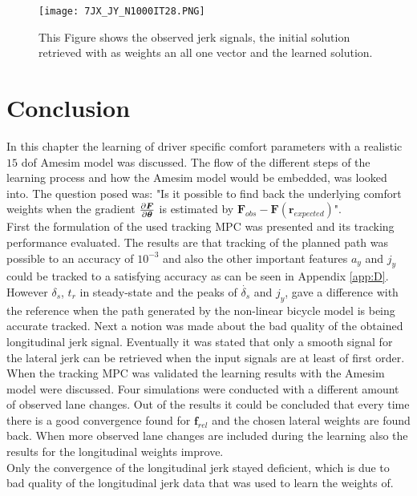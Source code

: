 \begin{figure}[h!]
	\centering
	\texttt{[image: 7JX\_JY\_N1000IT28.PNG]}
	\caption{This Figure shows the observed jerk signals, the initial solution retrieved with as weights an all one vector and the learned solution.}	
	\label{fig:complex_jerk}
\end{figure}
 \newpage                                
\section{Conclusion}
In this chapter the learning of driver specific comfort parameters with a realistic $15$ dof Amesim model was discussed. The flow of the different steps of the learning process and how the Amesim model would be embedded, was looked into. The question posed was: "Is it possible to find back the underlying comfort weights when the gradient $\pdv{\bm{F}}{\bm{\theta}}$ is estimated by $ \bm{F}_{obs} - \bm{F}(\bm{r}_{expected})$". \\

First the formulation of the used tracking MPC was presented and its tracking performance evaluated. The results are that tracking of the planned path was possible to an accuracy of $10^{-3}$ and also the other important features $a_y$ and $j_y$ could be tracked to a satisfying accuracy as can be seen in Appendix \ref{app:D}. However $\delta_s$, $t_r$ in steady-state and the peaks of $\dot{\delta_s}$ and $j_y$, gave a difference with the reference when the path generated by the non-linear bicycle model is being accurate tracked. Next a notion was made about the bad quality of the obtained longitudinal jerk signal. Eventually it was stated that only a smooth signal for the lateral jerk can be retrieved when the input signals are at least of first order. \\

When the tracking MPC was validated the learning results with the Amesim model were discussed. Four simulations were conducted with a different amount of observed lane changes. Out of the results it could be concluded that every time there is a good convergence found for $\bm{f}_{rel}$ and the chosen lateral weights are found back. When more observed lane changes are included during the learning also the results for the longitudinal weights improve. \\
Only the convergence of the longitudinal jerk stayed deficient, which is due to bad quality of the longitudinal jerk data that was used to learn the weights of.



